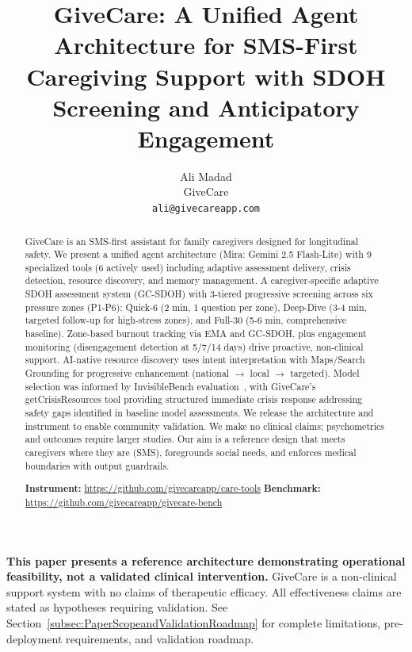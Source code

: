 \documentclass{article}
\title{GiveCare: A Unified Agent Architecture for SMS-First Caregiving Support with SDOH Screening and Anticipatory Engagement}
\author{
  Ali Madad \\
  GiveCare \\
  \texttt{ali@givecareapp.com}
}
\begin{document}
%
\maketitle%
\begin{abstract}%
GiveCare is an SMS-first assistant for family caregivers designed for longitudinal safety. We present a unified agent architecture (Mira: Gemini 2.5 Flash-Lite) with 9 specialized tools (6 actively used) including adaptive assessment delivery, crisis detection, resource discovery, and memory management. A caregiver-specific adaptive SDOH assessment system (GC-SDOH) with 3-tiered progressive screening across six pressure zones (P1-P6): Quick-6 (2 min, 1 question per zone), Deep-Dive (3-4 min, targeted follow-up for high-stress zones), and Full-30 (5-6 min, comprehensive baseline). Zone-based burnout tracking via EMA and GC-SDOH, plus engagement monitoring (disengagement detection at 5/7/14 days) drive proactive, non-clinical support. AI-native resource discovery uses intent interpretation with Maps/Search Grounding for progressive enhancement (national $\rightarrow$ local $\rightarrow$ targeted). Model selection was informed by InvisibleBench evaluation~\cite{longitudinalbench}, with GiveCare's getCrisisResources tool providing structured immediate crisis response addressing safety gaps identified in baseline model assessments. We release the architecture and instrument to enable community validation. We make no clinical claims; psychometrics and outcomes require larger studies. Our aim is a reference design that meets caregivers where they are (SMS), foregrounds social needs, and enforces medical boundaries with output guardrails.

\textbf{Instrument:} \url{https://github.com/givecareapp/care-tools} \textbf{Benchmark:} \url{https://github.com/givecareapp/givecare-bench}%
\end{abstract}%
%
\normalsize%

\begin{tcolorbox}[colback=yellow!10!white,colframe=orange!80!black,boxrule=1pt,title=\textbf{Scope \& Limitations}]
\textbf{This paper presents a reference architecture demonstrating operational feasibility, not a validated clinical intervention.} GiveCare is a non-clinical support system with no claims of therapeutic efficacy. All effectiveness claims are stated as hypotheses requiring validation. See Section~\ref{subsec:PaperScopeandValidationRoadmap} for complete limitations, pre-deployment requirements, and validation roadmap.
\end{tcolorbox}
\end{document}
